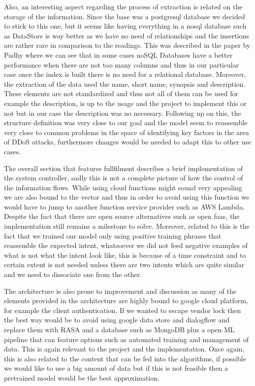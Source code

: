 Also, an interesting aspect regarding the process of extraction is related on the storage of the information. Since the base was a postgresql database we decided to stick to this one, but it seems like having everything in a nosql database such as DataStore is way better as we have no need of relationships and the insertions are rather rare in comparison to the readings. This was described in the paper by Padhy \cite{nosql} where we can see that in some cases noSQL Databases have a better performance when there are not too many columns and thus in our particular case once the index is built there is no need for a relational database. Moreover, the extraction of the data used the name, short name, synopsis and description. These elements are not standardized and thus not all of them can be used for example the description, is up to the usage and the project to implement this or not but in our case the description was no necessary. Following up on this, the structure definition was very close to our goal and the model seem to reassemble very close to common problems in the space of identifying key factors in the area of DDoS attacks, furthermore changes would be needed to adapt this to other use cases.

The overall section that features fullfilment describes a brief implementation of the system controller, sadly this is not a complete picture of how the control of the information flows. While using cloud functions might sound very appealing we are also bound to the vector and thus in order to avoid using this function we would have to jump to another function service provider such as AWS Lambda. Despite the fact that there are open source alternatives such as open faas, the implementation still remains a milestone to solve. Moreover, related to this is the fact that we trained our model only using positive training phrases that reassemble the expected intent, whatsoever we did not feed negative examples of what is not what the intent look like, this is because of a time constraint and to certain extent is not needed unless there are two intents which are quite similar and we need to dissociate one from the other.

The architecture is also prone to improvement and discussion as many of the elements provided in the architecture are highly bound to google cloud platform, for example the client authentication. If we wanted to escape vendor lock then the best way would be to avoid using google data store and dialogflow and replace them with RASA and a database such as MongoDB plus a open ML pipeline that can feature options such as automated training and management of data. This is again relevant to the project and the implementation. Once again, this is also related to the content that can be fed into the algorithms, if possible we would like to use a big amount of data but if this is not feasible then a pretrained model would be the best approximation.

